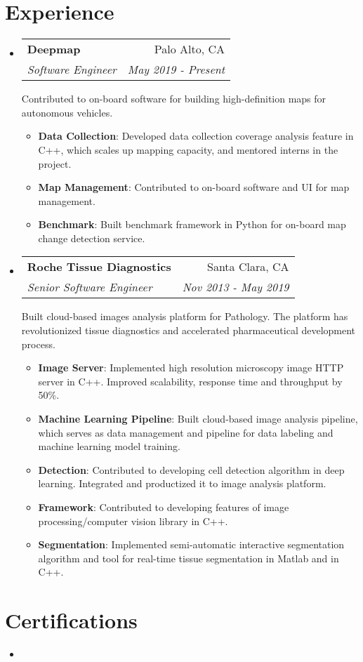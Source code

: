 \documentclass[letterpaper,12pt]{article}
\makeatletter
\newcommand{\resumeSubheading}[4]{
  \vspace{-1pt}\item
    \begin{tabular*}{0.97\textwidth}{l@{\extracolsep{\fill}}r}
      \textbf{#1} & #2 \\
      \textit{\small#3} & \textit{\small #4} \\
    \end{tabular*}
    \vspace{-7pt}
}
\newcommand{\resumeItem}[2]{
  \item\small{
    \textbf{#1}{: #2 \vspace{-2pt}}
  }
}
\newcommand{\resumeSummary}[1]{
  \vspace{11pt}
  	\small {#1 \vspace{-6pt}}
}
\newcommand{\resumeSubHeadingListStart}{\begin{itemize}[leftmargin=*]}
\newcommand{\resumeSubHeadingListEnd}{\end{itemize}}
\newcommand{\resumeItemListStart}{\begin{itemize}}
\newcommand{\resumeItemListEnd}{\end{itemize}\vspace{-5pt}}
\makeatother
\begin{document}
\section{Experience}
  \resumeSubHeadingListStart
    \resumeSubheading
      {Deepmap}{Palo Alto, CA}
      {Software Engineer}{May 2019 - Present}
      \resumeSummary 
      {Contributed to on-board software for building high-definition maps for autonomous vehicles.}
      \resumeItemListStart
        \resumeItem {Data Collection}
        {Developed data collection coverage analysis feature in C++, which scales up mapping capacity, and mentored interns in the project.}
        \resumeItem {Map Management}
        {Contributed to on-board software and UI for map management.}
        \resumeItem {Benchmark}
        {Built benchmark framework in Python for on-board map change detection service.}
      \resumeItemListEnd
    \resumeSubheading
      {Roche Tissue Diagnostics}{Santa Clara, CA}
      {Senior Software Engineer}{Nov 2013 - May 2019}
      \resumeSummary 
      {Built cloud-based images analysis platform for Pathology. The platform has revolutionized tissue diagnostics and accelerated pharmaceutical development process.}
      \resumeItemListStart
        \resumeItem {Image Server}
          {Implemented high resolution microscopy image HTTP server in C++. Improved scalability, response time and throughput by 50\%.}
        \resumeItem {Machine Learning Pipeline}
          {Built cloud-based image analysis pipeline, which serves as data management and pipeline for data labeling and machine learning model training.}
        \resumeItem {Detection}
          {Contributed to developing cell detection algorithm in deep learning. Integrated and productized it to image analysis platform.}
        \resumeItem {Framework}
          {Contributed to developing features of image processing/computer vision library in C++.}
        \resumeItem {Segmentation}
          {Implemented semi-automatic interactive segmentation algorithm and tool for real-time tissue segmentation in Matlab and in C++.}
      \resumeItemListEnd
  \resumeSubHeadingListEnd

\section{Certifications}
  \resumeSubHeadingListStart
    \item[]{
    }
  \resumeSubHeadingListEnd
\end{document}

